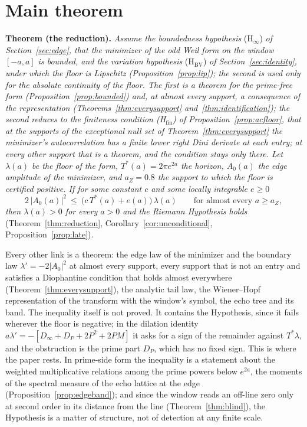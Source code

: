 \documentclass[11pt]{article}
\theoremstyle{definition}
\theoremstyle{remark}
\newcommand{\Tst}{T^{*}}
\begin{document}
\section*{Main theorem}
\noindent\textbf{Theorem (the reduction).} \emph{Assume the boundedness hypothesis} (H$_\infty$) \emph{of Section~\ref{sec:edge}, that the minimizer of the odd Weil form on the window $[-a,a]$ is bounded, and the variation hypothesis} (H$_{\mathrm{BV}}$) \emph{of Section~\ref{sec:identity}, under which the floor is Lipschitz (Proposition~\ref{prop:lip}); the second is used only for the absolute continuity of the floor. The first is a theorem for the prime-free form (Proposition~\ref{prop:bounded}) and, at almost every support, a consequence of the representation (Theorems~\ref{thm:everysupport} and~\ref{thm:identification}); the second reduces to the finiteness condition (H$_{\mathrm{fin}}$) of Proposition~\ref{prop:acfloor}, that at the supports of the exceptional null set of Theorem~\ref{thm:everysupport} the minimizer's autocorrelation has a finite lower right Dini derivate at each entry; at every other support that is a theorem, and the condition stays only there. Let $\lambda(a)$ be the floor of the form, $\Tst(a)=2\pi e^{2a}$ the horizon, $A_0(a)$ the edge amplitude of the minimizer, and $a_Z=0.8$ the support to which the floor is certified positive. If for some constant $c$ and some locally integrable $e\ge0$}
\[
2\,|A_0(a)|^2\ \le\ \big(c\,\Tst(a)+e(a)\big)\,\lambda(a)\qquad\text{for almost every }a\ge a_Z ,
\]
\emph{then $\lambda(a)>0$ for every $a>0$ and the Riemann Hypothesis holds} (Theorem~\ref{thm:reduction}, Corollary~\ref{cor:unconditional}, Proposition~\ref{prop:late}).

\noindent Every other link is a theorem: the edge law of the minimizer and the boundary law $\lambda'=-2|A_0|^2$ at almost every support, every support that is not an entry and satisfies a Diophantine condition that holds almost everywhere (Theorem~\ref{thm:everysupport}), the analytic tail law, the Wiener--Hopf representation of the transform with the window's symbol, the echo tree and its band. The inequality itself is not proved. It contains the Hypothesis, since it fails wherever the floor is negative; in the dilation identity $a\lambda'=-[D_\infty+D_P+2P^2+2PM]$ it asks for a sign of the remainder against $\Tst\lambda$, and the obstruction is the prime part $D_P$, which has no fixed sign. This is where the paper rests. In prime-side form the inequality is a statement about the weighted multiplicative relations among the prime powers below $e^{2a}$, the moments of the spectral measure of the echo lattice at the edge (Proposition~\ref{prop:edgeband}); and since the window reads an off-line zero only at second order in its distance from the line (Theorem~\ref{thm:blind}), the Hypothesis is a matter of structure, not of detection at any finite scale.
\end{document}
